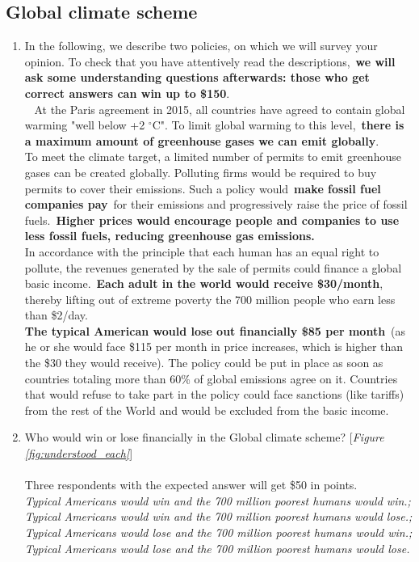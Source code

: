 \subsection*{Global climate scheme}
\begin{enumerate}[resume] \item[] In the following, we describe two policies, on which we will survey your opinion. To check that you have attentively read the descriptions,~\textbf{we will ask some understanding questions afterwards: those who get correct answers can win up to \$150}. \\
\textbf{}~ At the Paris agreement in 2015, all countries have agreed to contain global warming "well below +2 $\mathrm{{}^\circ}$C". To limit global warming to this level,~\textbf{there is a maximum amount of greenhouse gases we can emit globally}.\\
To meet the climate target, a limited number of permits to emit greenhouse gases can be created globally. Polluting firms would be required to buy permits to cover their emissions. Such a policy would~\textbf{make fossil fuel companies pay}~for their emissions and progressively raise the price of fossil fuels.~\textbf{Higher prices would encourage people and companies to use less fossil fuels, reducing greenhouse gas emissions.}\\
In accordance with the principle that each human has an equal right to pollute, the revenues generated by the sale of permits could finance a global basic income.~\textbf{Each adult in the world would receive \$30/month}, thereby lifting out of extreme poverty the 700 million people who earn less than \$2/day.\\
\textbf{The typical American would lose out financially \$85 per month}~(as he or she would face \$115 per month in price increases, which is higher than the \$30 they would receive). The policy could be put in place as soon as countries totaling more than 60\% of global emissions agree on it. Countries that would refuse to take part in the policy could face sanctions (like tariffs) from the rest of the World and would be excluded from the basic income.
\item \label{q:understood_gcs} Who would win or lose financially in the Global climate scheme? [\textit{Figure \ref{fig:understood_each}}] \\
\\
Three respondents with the expected answer will get \$50 in points.
\\ \textit{Typical Americans would win and the 700 million poorest humans would win.; Typical Americans would win and the 700 million poorest humans would lose.; Typical Americans would lose and the 700 million poorest humans would win.; Typical Americans would lose and the 700 million poorest humans would lose.}

\end{enumerate}
